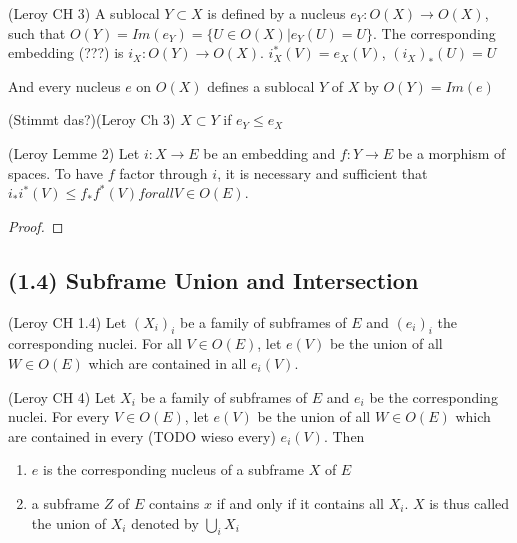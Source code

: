 \begin{definition}[Subframe]
(Leroy CH 3)
    \label{def:subframe}
    \leanok
    A sublocal $Y \subset X$ is defined by a nucleus $e_Y: O(X) \rightarrow O(X)$, such that $O(Y) = Im(e_Y) = \{U \in O(X) | e_Y(U) = U\}$.
    The corresponding embedding (???) is $i_X : O(Y) \rightarrow O(X)$. $i^*_X(V) = e_X(V)$, $(i_X)_*(U) = U$

    And every nucleus $e$ on $O(X)$ defines a sublocal $Y$ of $X$ by $O(Y) = Im(e)$
\end{definition}

\begin{definition}
(Stimmt das?)(Leroy Ch 3)
    \label{def:subframe_inclusion}
    \leanok
    $X \subset Y$ if $e_Y \le e_X$
\end{definition}

\begin{lemma}[factorisation]
(Leroy Lemme 2)
    \label{lem:factorisation}
    \leanok
    Let $i : X \rightarrow E$ be an embedding and $f: Y \rightarrow E$ be a morphism of spaces. To have $f$ factor through $i$, it is necessary and sufficient that $i_*i^*(V) \le f_*f^*(V) for all V \in O(E)$.
\end{lemma}
\begin{proof}
    \leanok
\end{proof}

\subsection{(1.4) Subframe Union and Intersection}
\begin{definition}
(Leroy CH 1.4)
    \label{def:subframe_union}
    \leanok
    Let $(X_i)_i$ be a family of subframes of $E$ and $(e_i)_i$ the corresponding nuclei.
    For all $V \in O(E)$, let $e(V)$ be the union of all $W \in O(E)$ which are contained in all $e_i(V)$.
\end{definition}

\begin{lemma}
(Leroy CH 4)
    \label{lem:family_of_subframes}
    Let $X_i$ be a family of subframes of $E$ and $e_i$ be the corresponding nuclei. For every $V \in O(E)$, let
    $e(V)$ be the union of all $W \in O(E)$ which are contained in every (TODO wieso every) $e_i(V)$. Then \\
    \begin{enumerate}
        \item $e$ is the corresponding nucleus of a subframe $X$ of $E$
        \item a subframe $Z$ of $E$ contains $x$ if and only if it contains all $X_i$. $X$ is thus called the union of
        $X_i$ denoted by $\bigcup_i X_i$
    \end{enumerate}
\end{lemma}

